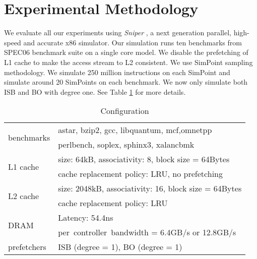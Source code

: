 \section{Experimental Methodology}
\label{sec:methodology}

We evaluate all our experiments using \emph{Sniper} \cite{sniperpaper}, a next generation parallel, high-speed and accurate x86 simulator. Our simulation runs ten benchmarks from SPEC06 benchmark suite on a single core model. We disable the prefetching of L1 cache to make the access stream to L2 consistent. We use SimPoint sampling methodology. We simulate 250 million instructions on each SimPoint and simulate around 20 SimPoints on each benchmark. We now only simulate both ISB and BO with degree one. See Table \ref{table:config} for more details. 
\begin{table}[ht!]
\centering
        \renewcommand{\multirowsetup}{\centering}  
        \begin{tabular}{|l|l|} 
        \hline  
        \multirow{2}{3cm}{benchmarks}   & {astar, bzip2, gcc, libquantum, mcf,omnetpp} \\
         \multirow{2}{3cm}{}  & {perlbench, soplex, sphinx3, xalancbmk} \\ \cline{1-2}
         \multirow{2}{3cm}{L1 cache}  & {size: 64kB, associativity: 8, block size = 64Bytes} \\
         \multirow{2}{3cm}{}  & {cache replacement policy: LRU, no prefetching} \\ \cline{1-2}
         \multirow{2}{3cm}{L2 cache}  & {size: 2048kB, associativity: 16, block size = 64Bytes} \\
         \multirow{2}{3cm}{}  & {cache replacement policy: LRU} \\ \cline{1-2}
         \multirow{2}{3cm}{DRAM }  
         	& {Latency: 54.4ns } \\ 
	 \multirow{1}{3cm}{}  & {per\ controller\ bandwidth = 6.4GB/s or 12.8GB/s} \\ \cline{1-2}
         \multirow{1}{3cm}{prefetchers}  & {ISB (degree = 1), BO (degree = 1)} \\ \cline{1-2}
        \hline 
        \end{tabular} 
\caption{Configuration}
\label{table:config}
\end{table}



